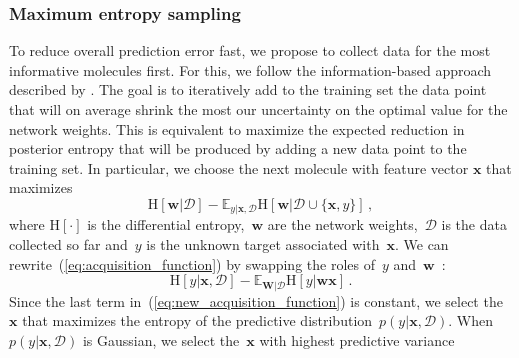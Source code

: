 \subsubsection{Maximum entropy sampling}

To reduce overall prediction error fast, we propose to collect data for the most informative molecules first. For this, we follow the information-based approach described by \cite{MacKay_1992}. The goal is to iteratively add to the training set the data point that will on average shrink the most our uncertainty on the optimal value for the network weights. This is equivalent to maximize the expected reduction in posterior entropy that will be produced by adding a new data point to the training set. In particular, we choose the next molecule with feature vector $\mathbf{x}$ that maximizes
\begin{equation}
\text{H}[\mathbf{w}|\mathcal{D}] - 
\mathbb{E}_{y|\mathbf{x},\mathcal{D}}\text{H}[\mathbf{w}|\mathcal{D}\cup\{\mathbf{x},y\}]\,,\label{eq:acquisition_function}
\end{equation}
where $\text{H}[\cdot]$ is the differential entropy,~$\mathbf{w}$ are the network weights,~$\mathcal{D}$ is the data collected so far and~$y$ is the unknown target associated with~$\mathbf{x}$. We can rewrite~(\ref{eq:acquisition_function}) by swapping the roles of~$y$ and~$\mathbf{w}$~\cite{houlsby2012collaborative}:
\begin{equation}
\text{H}[y | \mathbf{x},\mathcal{D}] - 
\mathbb{E}_{\mathbf{W} | \mathcal{D}}\text{H}[y | \mathbf{w}\mathbf{x}]\,.\label{eq:new_acquisition_function}
\end{equation}
Since the last term in~(\ref{eq:new_acquisition_function}) is constant, we select the~$\mathbf{x}$ that maximizes the entropy of the predictive distribution~$p(y| \mathbf{x},\mathcal{D})$. When $p(y| \mathbf{x},\mathcal{D})$ is Gaussian, we select the~$\mathbf{x}$ with highest predictive variance